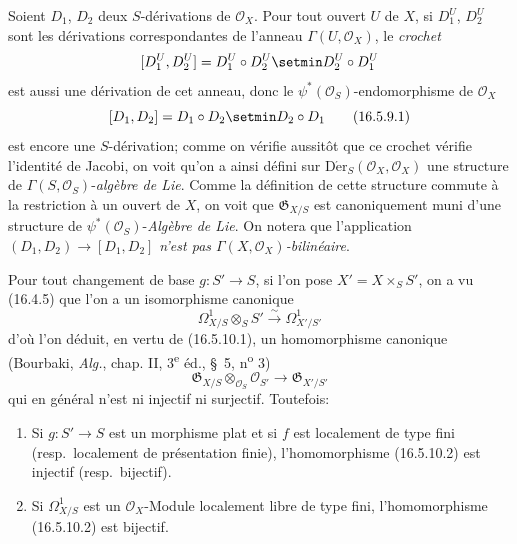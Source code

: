 \begin{env}[16.5.9]
\label{IV.16.5.9}
Soient $D_1$, $D_2$ deux $S$-dérivations de $\mathcal{O}_X$. Pour tout ouvert
$U$ de $X$, si $D_1^U$, $D_2^U$ sont les dérivations correspondantes de
l'anneau $\Gamma(U,\mathcal{O}_X)$, le \emph{crochet}
\[
  [D_1^U,D_2^U]=D_1^U\circ D_2^U\setmin D_2^U\circ D_1^U
\]
est aussi une dérivation de cet anneau, donc le
$\psi^*(\mathcal{O}_S)$-endomorphisme de $\mathcal{O}_X$
\[
  [D_1,D_2]=D_1\circ D_2\setmin D_2\circ D_1
  \tag{16.5.9.1}
  \label{IV.16.5.9.1}
\]
est encore une $S$-dérivation; comme on vérifie aussitôt que ce crochet
vérifie l'identité de Jacobi, on voit qu'on a ainsi défini sur
$\operatorname{D\acute{e}r}_S(\mathcal{O}_X,\mathcal{O}_X)$ une structure de
$\Gamma(S,\mathcal{O}_S)$-\emph{algèbre de Lie}. Comme la définition de cette
structure commute à la restriction à un ouvert de $X$, on voit que
$\mathfrak{G}_{X/S}$ est canoniquement muni d'une structure de
$\psi^*(\mathcal{O}_S)$-\emph{Algèbre de Lie}. On notera que l'application
$(D_1,D_2)\to[D_1,D_2]$ \emph{n'est pas
$\Gamma(X,\mathcal{O}_X)$-bilinéaire}.
\end{env}

\begin{env}[16.5.10]
\label{IV.16.5.10}
Pour tout changement de base $g:S'\to S$, si l'on pose $X'=X\times_S S'$, on
a vu (16.4.5) que l'on a un isomorphisme canonique
\[
  \varOmega_{X/S}^1\otimes_S S'\xrightarrow{\sim}\varOmega_{X'/S'}^1
  \tag{16.5.10.1}
  \label{IV.16.5.10.1}
\]
d'où l'on déduit, en vertu de (16.5.10.1), un homomorphisme canonique
(Bourbaki, \emph{Alg.}, chap. II, 3\textsuperscript{e} éd., \S~5,
n\textsuperscript{o} 3)
\[
  \mathfrak{G}_{X/S}\otimes_{\mathcal{O}_S}\mathcal{O}_{S'}
  \longrightarrow\mathfrak{G}_{X'/S'}
  \tag{16.5.10.2}
  \label{IV.16.5.10.2}
\]
qui en général n'est ni injectif ni surjectif. Toutefois:
\end{env}

\begin{proposition}[16.5.11]
\label{IV.16.5.11}
\begin{enumerate}
\item[\textup{(i)}] Si $g:S'\to S$ est un morphisme plat et si $f$ est localement de
type fini \textup{(resp.}\ localement de présentation finie\textup{)}, l'homomorphisme
\textup{(16.5.10.2)} est injectif \textup{(resp.}\ bijectif\textup{)}.
\item[\textup{(ii)}] Si $\varOmega_{X/S}^1$ est un $\mathcal{O}_X$-Module localement libre
de type fini, l'homomorphisme \textup{(16.5.10.2)} est bijectif.
\end{enumerate}
\end{proposition}

